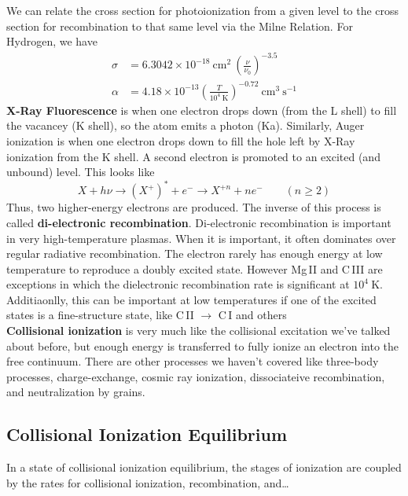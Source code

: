 \documentclass[10pt]{article}
\numberwithin{equation}{section}
\newcommand{\n}{\noindent}
\begin{document}
\n We can relate the cross section for photoionization from a given level to
the cross section for recombination to that same level via the Milne Relation.
For Hydrogen, we have
\begin{align}
  \label{eq:photoion:2} \sigma &= 6.3042\times 10^{-18}\ \mathrm{cm^2}\
  \left(\frac{\nu}{\nu_0}\right)^{-3.5}\\
  \label{eq:photoion:3} \alpha &= 4.18\times 10^{-13}\left(\frac{T}{10^4\
  \mathrm{K}}\right)^{-0.72}\ \mathrm{cm^3\ s^{-1}}
\end{align}
  \textbf{X-Ray Fluorescence} is when one electron drops down (from the L
  shell) to fill the vacancey (K shell), so the atom emits a photon (Ka).
  Similarly, Auger ionization is when one electron drops down to fill the hole
  left by X-Ray ionization from the K shell. A second electron is promoted to
  an excited (and unbound) level. This looks like
  \begin{equation}
    \label{eq:x-ray} X + h\nu \to (X^+)^* + e^- \to X^{+n} + ne^- \qquad (n
    \geq 2)
  \end{equation}
  Thus, two higher-energy electrons are produced. The inverse of this process
  is called \textbf{di-electronic recombination}. Di-electronic recombination
  is important in very high-temperature plasmas. When it is important, it often
  dominates over regular radiative recombination. The electron rarely has
  enough energy at low temperature to reproduce a doubly excited state. However
  Mg\,II and C\,III are exceptions in which the dielectronic recombination rate
  is significant at $10^4\ \mathrm{K}$. Additiaonlly, this can be important at
  low temperatures if one of the excited states is a fine-structure state, like
  C\,II $\to$ C\,I and others\\

  \n \textbf{Collisional ionization} is very much like the collisional
  excitation we've talked about before, but enough energy is transferred to
  fully ionize an electron into the free continuum. There are other processes
  we haven't covered like three-body processes, charge-exchange, cosmic ray
  ionization, dissociateive recombination, and neutralization by grains.

\subsection{Collisional Ionization Equilibrium} %
\label{sub:collisional_ionization_equilibrium}
  In a state of collisional ionization equilibrium, the stages of ionization
  are coupled by the rates for collisional ionization, recombination, and\ldots
  
\end{document}
